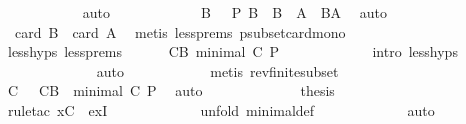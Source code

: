 \begin{isabellebody}
\ \ \ \ \ \ \ \ \ \ \isamarkupfalse%
\ auto\isanewline
\ \ \ \ \ \ \ \ \isamarkupfalse%
\ {}\ \isamarkupfalse%
\ B\ \ {}{\isacharcolon}\ {\isachardoublequoteopen}P\ B\ {\isasymand}\ B\ {\isasymsubset}\ A\ {\isasymand}\ B{\isasymnoteq}A{\isachardoublequoteclose}\ \isamarkupfalse%
\ auto\isanewline
\ \ \ \ \ \ \ \ \isamarkupfalse%
\ {}\ \isamarkupfalse%
\ {}{\isacharcolon}\ {\isachardoublequoteopen}card\ B\ {\isacharless}\ card\ A{\isachardoublequoteclose}\ \isamarkupfalse%
\ {\isacharparenleft}metis\ less{\isachardot}prems{\isacharparenleft}{}{\isacharparenright}\ psubset{\isacharunderscore}card{\isacharunderscore}mono{\isacharparenright}\isanewline
\ \ \ \ \ \ \ \ \isamarkupfalse%
\ less{\isachardot}hyps\ less{\isachardot}prems\ {}\ {}\ {}\ \isamarkupfalse%
\ {}{\isacharcolon}\ {\isachardoublequoteopen}{\isasymexists}C{\isasymsubseteq}B{\isachardot}\ minimal\ C\ P{\isachardoublequoteclose}\ \isanewline
\ \ \ \ \ \ \ \ \ \ \isamarkupfalse%
\ {\isacharparenleft}intro\ less{\isachardot}hyps{\isacharparenright}\ \isanewline
\ \ \ \ \ \ \ \ \ \ \ \ \isamarkupfalse%
\ auto\isanewline
\ \ \ \ \ \ \ \ \ \ \isamarkupfalse%
\ {\isacharparenleft}metis\ rev{\isacharunderscore}finite{\isacharunderscore}subset{\isacharparenright}\isanewline
\ \ \ \ \ \ \ \ \isamarkupfalse%
\ {}\ \isamarkupfalse%
\ C\ \ {}{\isacharcolon}\ {\isachardoublequoteopen}C{\isasymsubseteq}B\ {\isasymand}\ minimal\ C\ P{\isachardoublequoteclose}\ \isamarkupfalse%
\ auto\isanewline
\ \ \ \ \ \ \ \ \isamarkupfalse%
\ {}\ {}\ \isamarkupfalse%
\ {\isacharquery}thesis\ \isanewline
\ \ \ \ \ \ \ \ \ \ \isamarkupfalse%
\ {\isacharparenleft}rule{\isacharunderscore}tac\ x{\isacharequal}{\isachardoublequoteopen}C{\isachardoublequoteclose}\ \ exI{\isacharparenright}\ \isanewline
\ \ \ \ \ \ \ \ \ \ \isamarkupfalse%
\ {\isacharparenleft}unfold\ minimal{\isacharunderscore}def{\isacharparenright}\ \isanewline
\ \ \ \ \ \ \ \ \ \ \isamarkupfalse%
\ auto\isanewline
\ \ \ \ \ \isamarkupfalse%
\isanewline
\ \ \ \isamarkupfalse%
\isanewline
{}\isamarkupfalse%

\end{isabellebody}
